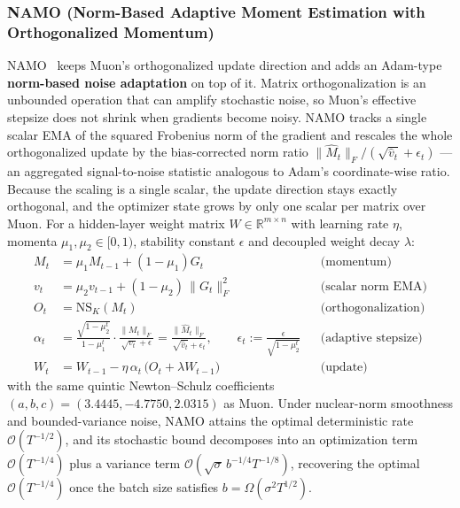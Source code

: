 \subsubsection{NAMO (Norm-Based Adaptive Moment Estimation with Orthogonalized Momentum)}
NAMO~\citep{zhang_namo_2026} keeps Muon's orthogonalized update direction and adds an
Adam-type \textbf{norm-based noise adaptation} on top of it. Matrix orthogonalization is
an unbounded operation that can amplify stochastic noise, so Muon's effective stepsize
does not shrink when gradients become noisy. NAMO tracks a single scalar EMA of the
squared Frobenius norm of the gradient and rescales the whole orthogonalized update by
the bias-corrected norm ratio $\lVert\widehat M_t\rVert_F/(\sqrt{\widehat v_t}+\epsilon_t)$
--- an aggregated signal-to-noise statistic analogous to Adam's coordinate-wise ratio.
Because the scaling is a single scalar, the update direction stays exactly orthogonal,
and the optimizer state grows by only one scalar per matrix over Muon. For a
hidden-layer weight matrix $W \in \mathbb{R}^{m\times n}$ with learning rate $\eta$,
momenta $\mu_1,\mu_2 \in [0,1)$, stability constant $\epsilon$ and decoupled weight
decay $\lambda$:
\begin{align}
M_t &= \mu_1 M_{t-1} + (1-\mu_1) G_t && \text{(momentum)} \\
v_t &= \mu_2 v_{t-1} + (1-\mu_2)\,\lVert G_t\rVert_F^2 && \text{(scalar norm EMA)} \\
O_t &= \mathrm{NS}_K(M_t) && \text{(orthogonalization)} \\
\alpha_t &= \frac{\sqrt{1-\mu_2^t}}{1-\mu_1^t}\cdot\frac{\lVert M_t\rVert_F}{\sqrt{v_t}+\epsilon}
   = \frac{\lVert\widehat M_t\rVert_F}{\sqrt{\widehat v_t}+\epsilon_t},
   \qquad \epsilon_t := \frac{\epsilon}{\sqrt{1-\mu_2^t}} && \text{(adaptive stepsize)} \\
W_t &= W_{t-1} - \eta\,\alpha_t\,\bigl(O_t + \lambda W_{t-1}\bigr) && \text{(update)}
\end{align}
with the same quintic Newton--Schulz coefficients $(a,b,c)=(3.4445,-4.7750,2.0315)$ as
Muon. Under nuclear-norm smoothness and bounded-variance noise, NAMO attains the optimal
deterministic rate $\mathcal{O}(T^{-1/2})$, and its stochastic bound decomposes into an
optimization term $\mathcal{O}(T^{-1/4})$ plus a variance term
$\mathcal{O}(\sqrt{\sigma}\,b^{-1/4}T^{-1/8})$, recovering the optimal $\mathcal{O}(T^{-1/4})$
once the batch size satisfies $b=\Omega(\sigma^2 T^{1/2})$.

